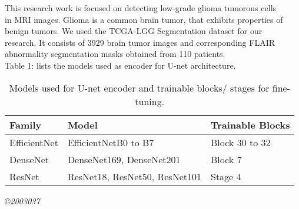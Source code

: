 \documentclass[a4paper, 10pt]{article}
\begin{document}
This research work is focused on detecting low-grade glioma tumorous cells \\
in MRI images. Glioma is a common brain tumor, that exhibits properties of \\
benign tumors\cite{wadhwa2019review}. We used the TCGA-LGG Segmentation dataset\cite{buda2019association} for our \\
research. It consists of 3929 brain tumor images and corresponding FLAIR \\
abnormality segmentation masks obtained from 110 patients. \\
\indent Table 1: lists the models used as encoder for U-net architecture.\\

\begin{table}[h!]
    \noindent\caption{Models used for U-net encoder and trainable blocks/ stages for fine-\\tuning.}
    \vspace{2mm} %
    \begin{tabularx}{\linewidth}{>{\centering\arraybackslash}X >{\centering\arraybackslash}X >{\centering\arraybackslash}X}
        \hline
        \textbf{Family} & \textbf{Model} & \textbf{Trainable Blocks}\\
        \hline
        EfficientNet & EfficientNetB0 to B7 & Block 30 to 32\\
        DenseNet & DenseNet169, DenseNet201 & Block 7\\
        ResNet & ResNet18, ResNet50, ResNet101& Stage 4\\
        \hline
    \end{tabularx}
\end{table}



\copyright \emph{2003037}
\end{document}
